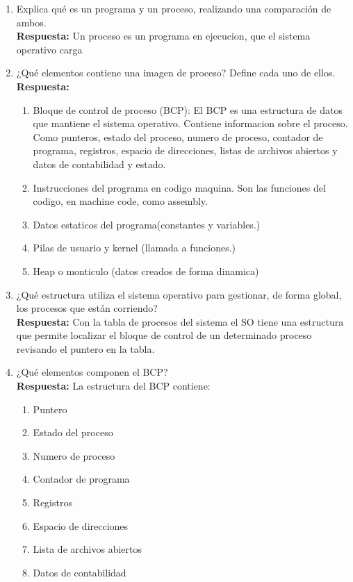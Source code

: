 \documentclass[a4paper,12pt]{article}
\begin{document}
\begin{enumerate}[label=\textbf{Pregunta \arabic*.}]
    \item Explica qué es un programa y un proceso, realizando una comparación de ambos. \\
    \textbf{Respuesta:} Un proceso es un programa en ejecucion, que el sistema operativo carga 

    \item ¿Qué elementos contiene una imagen de proceso? Define cada uno de ellos. \\
    \textbf{Respuesta:} 
    \begin{enumerate}
        \item Bloque de control de proceso (BCP): El BCP es una estructura de datos que mantiene el sistema operativo. Contiene informacion sobre el proceso. Como punteros, estado del proceso, numero de proceso, contador de programa, registros, espacio de direcciones, listas de archivos abiertos y datos de contabilidad y estado.
        \item Instrucciones del programa en codigo maquina. Son las funciones del codigo, en machine code, como assembly.
        \item Datos estaticos del programa(constantes y variables.)
        \item Pilas de usuario y kernel (llamada a funciones.)
        \item Heap o monticulo (datos creados de forma dinamica)
    \end{enumerate}

    \item ¿Qué estructura utiliza el sistema operativo para gestionar, de forma global, los procesos que están corriendo? \\
    \textbf{Respuesta:} %
    Con la tabla de procesos del sistema el SO tiene una estructura que permite localizar el bloque de control de un determinado proceso revisando el puntero en la tabla.
    \newpage
    \item ¿Qué elementos componen el BCP? \\
    \textbf{Respuesta:} %
    La estructura del BCP contiene:
    \begin{enumerate}
        \item Puntero
        \item Estado del proceso
        \item Numero de proceso
        \item Contador de programa
        \item Registros
        \item Espacio de direcciones
        \item Lista de archivos abiertos
        \item Datos de contabilidad
    \end{enumerate}


\end{enumerate}
\end{document}
